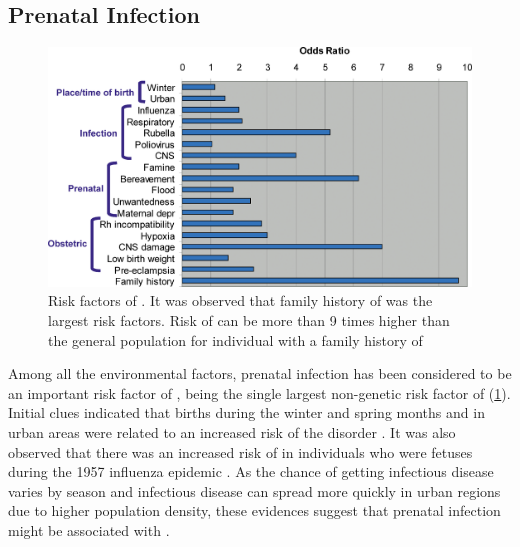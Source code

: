 	\subsection{Prenatal Infection}
	\begin{figure}
		\centering
		\includegraphics[width=\textwidth]{figure/risk_factors_of_schizophrenia.png}
		\caption[Risk factors of ]{Risk factors of .
			It was observed that family history of  was the largest risk factors.
			Risk of  can be more than 9 times higher than the general population for individual with a family history of }
		\label{fig:riskfactors}
	\end{figure}
	Among all the environmental factors, prenatal infection has been considered to be an important risk factor of , being the single largest non-genetic risk factor of  (\cref{fig:riskfactors})\citep{Sullivan2005}.
	Initial clues indicated that births during the winter and spring months and in urban areas were related to an increased risk of the disorder \citep{Brown2010}.
	It was also observed that there was an increased risk of  in individuals who were fetuses during the 1957 influenza epidemic \citep{Mednick1958}.
	As the chance of getting infectious disease varies by season and infectious disease can spread more quickly in urban regions due to higher population density, these evidences suggest that prenatal infection might be associated with .
	
